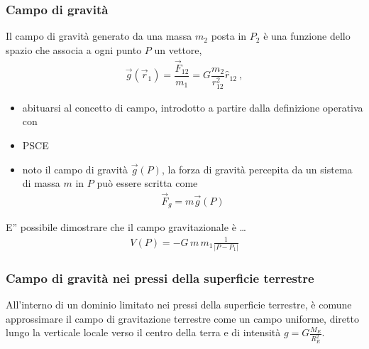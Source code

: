 \documentclass[letterpaper,10pt,italian]{jupyterBook}
\begin{document}
\subsubsection{Campo di gravità}
\label{\detokenize{ch/mechanics/actions-examples:campo-di-gravita}}
\sphinxAtStartPar
Il campo di gravità generato da una massa \(m_2\) posta in \(P_2\) è  una funzione dello spazio che associa a ogni punto \(P\) un vettore,
\begin{equation*}
\begin{split}\vec{g}(\vec{r}_1) = \dfrac{\vec{F}_{12}}{m_1} = G \dfrac{m_2}{r_{12}^2} \hat{r}_{12} \ ,\end{split}
\end{equation*}\begin{itemize}
\item {} 
\sphinxAtStartPar
{} abituarsi al concetto di campo, introdotto a partire dalla definizione operativa con 

\item {} 
\sphinxAtStartPar
{} PSCE

\item {} 
\sphinxAtStartPar
{} noto il campo di gravità \(\vec{g}(P)\), la forza di gravità percepita da un sistema di massa \(m\) in \(P\) può essere scritta come
\begin{equation*}
\begin{split}\vec{F}_g = m \vec{g}(P)\end{split}
\end{equation*}
\end{itemize}

\sphinxAtStartPar
{} E” possibile dimostrare che il campo gravitazionale è … 
\begin{equation*}
\begin{split}V(P) = - G \, m \, m_1 \frac{1}{|P - P_1|}\end{split}
\end{equation*}

\subsubsection{Campo di gravità nei pressi della superficie terrestre}
\label{\detokenize{ch/mechanics/actions-examples:campo-di-gravita-nei-pressi-della-superficie-terrestre}}
\sphinxAtStartPar
All’interno di un dominio limitato nei pressi della superficie terrestre, è comune approssimare il campo di gravitazione terrestre come un campo uniforme, diretto lungo la verticale locale verso il centro della terra e di intensità \(g = G \frac{M_E}{R_E^2}\).
\end{document}
